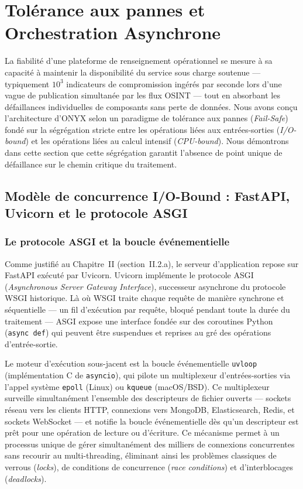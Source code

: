 
\section{Tolérance aux pannes et Orchestration Asynchrone}

La fiabilité d'une plateforme de renseignement opérationnel se mesure à sa capacité à maintenir la disponibilité du service sous charge soutenue --- typiquement $10^3$ indicateurs de compromission ingérés par seconde lors d'une vague de publication simultanée par les flux OSINT --- tout en absorbant les défaillances individuelles de composants sans perte de données. Nous avons conçu l'architecture d'ONYX selon un paradigme de tolérance aux pannes (\textit{Fail-Safe}) fondé sur la ségrégation stricte entre les opérations liées aux entrées-sorties (\textit{I/O-bound}) et les opérations liées au calcul intensif (\textit{CPU-bound}). Nous démontrons dans cette section que cette ségrégation garantit l'absence de point unique de défaillance sur le chemin critique du traitement.

\subsection{Modèle de concurrence I/O-Bound : FastAPI, Uvicorn et le protocole ASGI}

\subsubsection{Le protocole ASGI et la boucle événementielle}

Comme justifié au Chapitre~II (section~II.2.a), le serveur d'application repose sur FastAPI exécuté par Uvicorn. Uvicorn implémente le protocole ASGI (\textit{Asynchronous Server Gateway Interface}), successeur asynchrone du protocole WSGI historique. Là où WSGI traite chaque requête de manière synchrone et séquentielle --- un fil d'exécution par requête, bloqué pendant toute la durée du traitement --- ASGI expose une interface fondée sur des coroutines Python (\texttt{async def}) qui peuvent être suspendues et reprises au gré des opérations d'entrée-sortie.

Le moteur d'exécution sous-jacent est la boucle événementielle \texttt{uvloop} (implémentation C de \texttt{asyncio}), qui pilote un multiplexeur d'entrées-sorties via l'appel système \texttt{epoll} (Linux) ou \texttt{kqueue} (macOS/BSD). Ce multiplexeur surveille simultanément l'ensemble des descripteurs de fichier ouverts --- sockets réseau vers les clients HTTP, connexions vers MongoDB, Elasticsearch, Redis, et sockets WebSocket --- et notifie la boucle événementielle dès qu'un descripteur est prêt pour une opération de lecture ou d'écriture. Ce mécanisme permet à un processus unique de gérer simultanément des milliers de connexions concurrentes sans recourir au multi-threading, éliminant ainsi les problèmes classiques de verrous (\textit{locks}), de conditions de concurrence (\textit{race conditions}) et d'interblocages (\textit{deadlocks}).

